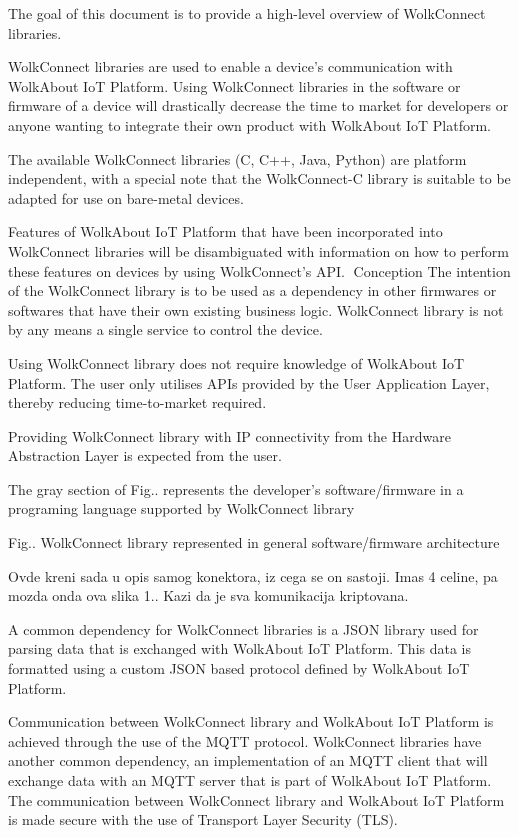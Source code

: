 The goal of this document is to provide a high-\/level overview of Wolk\+Connect libraries.

Wolk\+Connect libraries are used to enable a device’s communication with Wolk\+About IoT Platform. Using Wolk\+Connect libraries in the software or firmware of a device will drastically decrease the time to market for developers or anyone wanting to integrate their own product with Wolk\+About IoT Platform.

The available Wolk\+Connect libraries (C, C++, Java, Python) are platform independent, with a special note that the Wolk\+Connect-\/C library is suitable to be adapted for use on bare-\/metal devices.

Features of Wolk\+About IoT Platform that have been incorporated into Wolk\+Connect libraries will be disambiguated with information on how to perform these features on devices by using Wolk\+Connect’s A\+PI. Conception The intention of the Wolk\+Connect library is to be used as a dependency in other firmwares or softwares that have their own existing business logic. Wolk\+Connect library is not by any means a single service to control the device.

Using Wolk\+Connect library does not require knowledge of Wolk\+About IoT Platform. The user only utilises A\+P\+Is provided by the User Application Layer, thereby reducing time-\/to-\/market required.

Providing Wolk\+Connect library with IP connectivity from the Hardware Abstraction Layer is expected from the user.

The gray section of Fig.. represents the developer’s software/firmware in a programing language supported by Wolk\+Connect library

Fig.. Wolk\+Connect library represented in general software/firmware architecture

Ovde kreni sada u opis samog konektora, iz cega se on sastoji. Imas 4 celine, pa mozda onda ova slika 1.. Kazi da je sva komunikacija kriptovana.

A common dependency for Wolk\+Connect libraries is a J\+S\+ON library used for parsing data that is exchanged with Wolk\+About IoT Platform. This data is formatted using a custom J\+S\+ON based protocol defined by Wolk\+About IoT Platform.

Communication between Wolk\+Connect library and Wolk\+About IoT Platform is achieved through the use of the M\+Q\+TT protocol. Wolk\+Connect libraries have another common dependency, an implementation of an M\+Q\+TT client that will exchange data with an M\+Q\+TT server that is part of Wolk\+About IoT Platform. The communication between Wolk\+Connect library and Wolk\+About IoT Platform is made secure with the use of Transport Layer Security (T\+LS).

